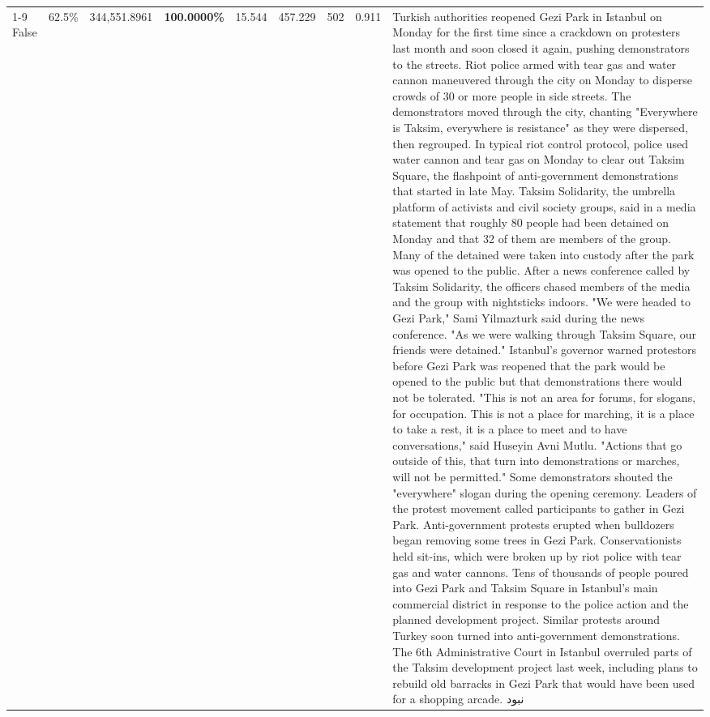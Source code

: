 \begin{table}[H]
\begin{tabular}{lllrlllll}
\cline{1-9}
False & 62.5\% & 344,551.8961 & \bfseries \color{red} 100.0000\% & 15.544 & 457.229 & 502 & 0.911 & Turkish authorities reopened Gezi Park in Istanbul on Monday for the first time since a crackdown on protesters last month and soon closed it again, pushing demonstrators to the streets. Riot police armed with tear gas and water cannon maneuvered through the city on Monday to disperse crowds of 30 or more people in side streets. The demonstrators moved through the city, chanting "Everywhere is Taksim, everywhere is resistance" as they were dispersed, then regrouped. In typical riot control protocol, police used water cannon and tear gas on Monday to clear out Taksim Square, the flashpoint of anti-government demonstrations that started in late May. Taksim Solidarity, the umbrella platform of activists and civil society groups, said in a media statement that roughly 80 people had been detained on Monday and that 32 of them are members of the group. Many of the detained were taken into custody after the park was opened to the public. After a news conference called by Taksim Solidarity, the officers chased members of the media and the group with nightsticks indoors. "We were headed to Gezi Park," Sami Yilmazturk said during the news conference. "As we were walking through Taksim Square, our friends were detained." Istanbul's governor warned protestors before Gezi Park was reopened that the park would be opened to the public but that demonstrations there would not be tolerated. "This is not an area for forums, for slogans, for occupation. This is not a place for marching, it is a place to take a rest, it is a place to meet and to have conversations," said Huseyin Avni Mutlu. "Actions that go outside of this, that turn into demonstrations or marches, will not be permitted." Some demonstrators shouted the "everywhere" slogan during the opening ceremony. Leaders of the protest movement called participants to gather in Gezi Park. Anti-government protests erupted when bulldozers began removing some trees in Gezi Park. Conservationists held sit-ins, which were broken up by riot police with tear gas and water cannons. Tens of thousands of people poured into Gezi Park and Taksim Square in Istanbul's main commercial district in response to the police action and the planned development project. Similar protests around Turkey soon turned into anti-government demonstrations. The 6th Administrative Court in Istanbul overruled parts of the Taksim development project last week, including plans to rebuild old barracks in Gezi Park that would have been used for a shopping arcade. نبود \\

\end{tabular}
\end{table}
